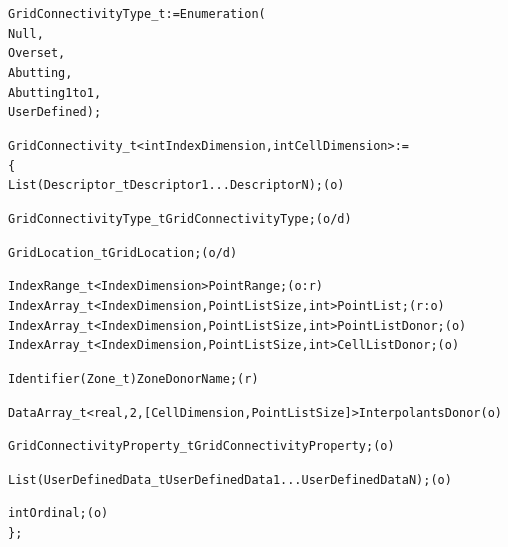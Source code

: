 \begin{alltt}
  GridConnectivityType\_t := Enumeration(
    Null,
    Overset,
    Abutting,
    Abutting1to1,
    UserDefined ) ;

  GridConnectivity\_t< int IndexDimension, int CellDimension > :=
    \{
    List( Descriptor\_t Descriptor1 ... DescriptorN ) ;                      (o)

    GridConnectivityType\_t GridConnectivityType ;                           (o/d)

    GridLocation\_t GridLocation ;                                           (o/d)

    IndexRange\_t<IndexDimension> PointRange ;                               (o:r)
    IndexArray\_t<IndexDimension, PointListSize, int>  PointList ;           (r:o)
    IndexArray\_t<IndexDimension, PointListSize, int>  PointListDonor ;      (o)
    IndexArray\_t<IndexDimension, PointListSize, int>  CellListDonor ;       (o)

    Identifier(Zone\_t) ZoneDonorName ;                                      (r)

    DataArray\_t <real, 2, [CellDimension, PointListSize]> InterpolantsDonor (o)

    GridConnectivityProperty\_t GridConnectivityProperty ;                   (o)

    List( UserDefinedData\_t UserDefinedData1 ... UserDefinedDataN ) ;       (o)

    int Ordinal ;                                                           (o)
    \} ;
\end{alltt}

